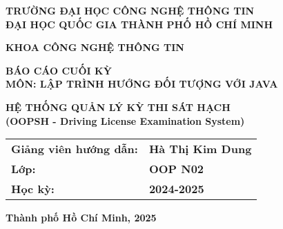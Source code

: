 \documentclass[12pt,a4paper]{article}
\begin{document}
\begin{titlepage}
    \centering
    \vspace*{2cm}
    
    {\Large\bfseries TRƯỜNG ĐẠI HỌC CÔNG NGHỆ THÔNG TIN}\\
    \vspace{0.5cm}
    {\Large\bfseries ĐẠI HỌC QUỐC GIA THÀNH PHỐ HỒ CHÍ MINH}\\
    
    \vspace{2cm}
    
    {\Large\bfseries KHOA CÔNG NGHỆ THÔNG TIN}\\
    
    \vspace{3cm}
    
    {\Huge\bfseries BÁO CÁO CUỐI KỲ}\\
    \vspace{0.5cm}
    {\Large\bfseries MÔN: LẬP TRÌNH HƯỚNG ĐỐI TƯỢNG VỚI JAVA}\\
    
    \vspace{2cm}
    
    {\Huge\bfseries HỆ THỐNG QUẢN LÝ KỲ THI SÁT HẠCH}\\
    {\Large\bfseries (OOPSH - Driving License Examination System)}\\
    
    \vspace{3cm}
    
    \begin{tabular}{ll}
        \textbf{Giảng viên hướng dẫn:} & \textbf{Hà Thị Kim Dung} \\
        \textbf{Lớp:} & \textbf{OOP N02} \\
        \textbf{Học kỳ:} & \textbf{2024-2025} \\
    \end{tabular}
    
    \vspace{2cm}
    
    {\Large\bfseries Thành phố Hồ Chí Minh, 2025}
    
\end{titlepage}
\end{document}
